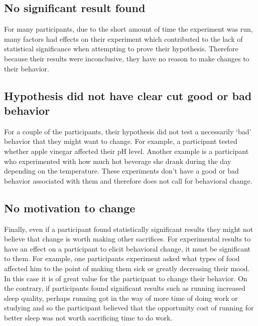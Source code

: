     \subsection{No significant result found}
    For many participants, due to the short amount of time the experiment was run, many factors had effects on their experiment which contributed to the lack of statistical significance when attempting to prove their hypothesis. Therefore because their results were inconclusive, they have no reason to make changes to their behavior.
    \subsection{Hypothesis did not have clear cut good or bad behavior}
    For a couple of the participants, their hypothesis did not test a necessarily \enquote*{bad} behavior that they might want to change. For example, a participant tested whether apple vinegar affected their pH level. Another example is a participant who experimented with how much hot beverage she drank during the day depending on the temperature. These experiments don’t have a good or bad behavior associated with them and therefore does not call for behavioral change. 
    \subsection{No motivation to change}
    Finally, even if a participant found statistically significant results they might not believe that change is worth making other sacrifices. For experimental results to have an effect on a participant to elicit behavioral change, it must be significant to them. For example, one participants experiment asked what types of food affected him to the point of making them sick or greatly decreasing their mood. In this case it is of great value for the participant to change their behavior. On the contrary, if participants found significant results such as running increased sleep quality, perhaps running got in the way of more time of doing work or studying and so the participant believed that the opportunity cost of running for better sleep was not worth sacrificing time to do work. 
